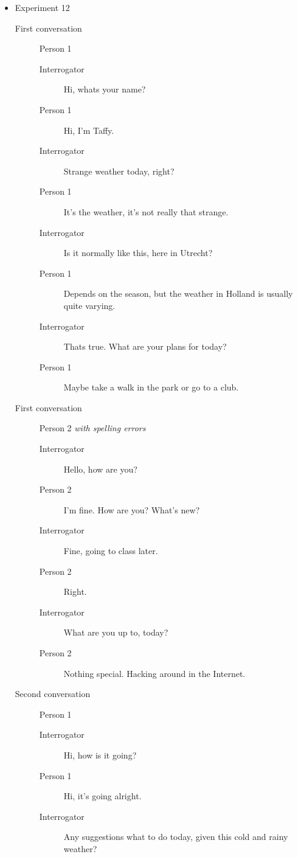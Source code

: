 \begin{itemize}
   \item Experiment 12
      \begin{description}
         \item [First conversation] Person 1
            \begin{description}
               \item [Interrogator] Hi, whats your name?
               \item [Person 1] Hi, I'm Taffy.
               \item [Interrogator] Strange weather today, right?
               \item [Person 1] It's the weather, it's not really that strange.
               \item [Interrogator] Is it normally like this, here in Utrecht?
               \item [Person 1] Depends on the season, but the weather in Holland is usually quite varying.
               \item [Interrogator] Thats true. What are your plans for today?
               \item [Person 1] Maybe take a walk in the park or go to a club.
            \end{description}
         \item [First conversation] Person 2 \textit{with spelling errors}
            \begin{description}
               \item [Interrogator] Hello, how are you?
               \item [Person 2] I'm fine. How are you? What's new?
               \item [Interrogator] Fine, going to class later.
               \item [Person 2] Right.
               \item [Interrogator] What are you up to, today?
               \item [Person 2] Nothing special. Hacking around in the Internet.
            \end{description}
         \item [Second conversation] Person 1
            \begin{description}
               \item [Interrogator] Hi, how is it going?
               \item [Person 1] Hi, it's going alright.
               \item [Interrogator] Any suggestions what to do today, given this cold and rainy weather?

\end{description}
\end{description}
\end{itemize}
